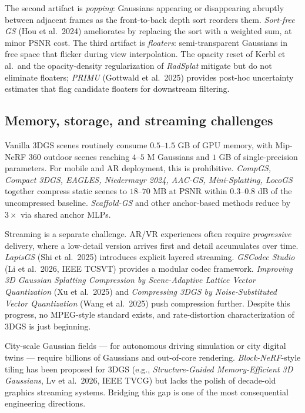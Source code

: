 The second artifact is \emph{popping}: Gaussians appearing or disappearing abruptly between adjacent frames as the front-to-back depth sort reorders them. \emph{Sort-free GS} (Hou et al.~2024) ameliorates by replacing the sort with a weighted sum, at minor PSNR cost. The third artifact is \emph{floaters}: semi-transparent Gaussians in free space that flicker during view interpolation. The opacity reset of Kerbl et al.~and the opacity-density regularization of \emph{RadSplat} mitigate but do not eliminate floaters; \emph{PRIMU} (Gottwald et al.~2025) provides post-hoc uncertainty estimates that flag candidate floaters for downstream filtering.

\subsection{Memory, storage, and streaming challenges}\label{memory-storage-and-streaming-challenges}

Vanilla 3DGS scenes routinely consume \(0.5\)--\(1.5\) GB of GPU memory, with Mip-NeRF 360 outdoor scenes reaching \(4\)--\(5\) M Gaussians and \(1\) GB of single-precision parameters. For mobile and AR deployment, this is prohibitive. \emph{CompGS, Compact 3DGS, EAGLES, Niedermayr 2024, AAC-GS, Mini-Splatting, LocoGS} together compress static scenes to \(18\)--\(70\) MB at PSNR within \(0.3\)--\(0.8\) dB of the uncompressed baseline. \emph{Scaffold-GS} and other anchor-based methods reduce by \(3\times\) via shared anchor MLPs.

Streaming is a separate challenge. AR/VR experiences often require \emph{progressive} delivery, where a low-detail version arrives first and detail accumulates over time. \emph{LapisGS} (Shi et al.~2025) introduces explicit layered streaming. \emph{GSCodec Studio} (Li et al.~2026, IEEE TCSVT) provides a modular codec framework. \emph{Improving 3D Gaussian Splatting Compression by Scene-Adaptive Lattice Vector Quantization} (Xu et al.~2025) and \emph{Compressing 3DGS by Noise-Substituted Vector Quantization} (Wang et al.~2025) push compression further. Despite this progress, no MPEG-style standard exists, and rate-distortion characterization of 3DGS is just beginning.

City-scale Gaussian fields --- for autonomous driving simulation or city digital twins --- require billions of Gaussians and out-of-core rendering. \emph{Block-NeRF}-style tiling has been proposed for 3DGS (e.g., \emph{Structure-Guided Memory-Efficient 3D Gaussians}, Lv et al.~2026, IEEE TVCG) but lacks the polish of decade-old graphics streaming systems. Bridging this gap is one of the most consequential engineering directions.

